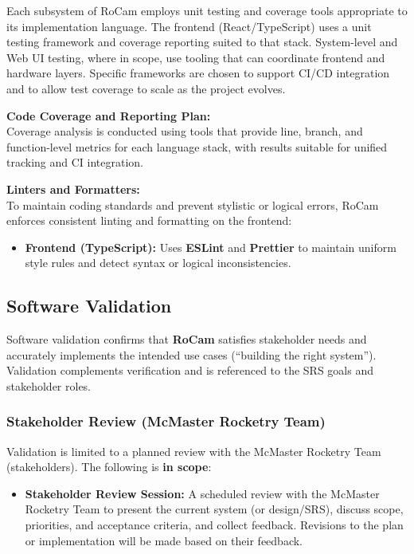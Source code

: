 \documentclass[12pt, titlepage]{article}
\begin{document}
Each subsystem of RoCam employs unit testing and coverage tools appropriate to
its implementation language. The frontend (React/TypeScript) uses a unit
testing framework and coverage reporting suited to that stack. System-level and
Web UI testing, where in scope, use tooling that can coordinate frontend and
hardware layers. Specific frameworks are chosen to support CI/CD integration
and to allow test coverage to scale as the project evolves.

\textbf{Code Coverage and Reporting Plan:} \\
Coverage analysis is conducted using tools that provide line, branch, and
function-level metrics for each language stack, with results suitable for
unified tracking and CI integration.

\textbf{Linters and Formatters:} \\
To maintain coding standards and prevent stylistic or logical errors, RoCam enforces
consistent linting and formatting on the frontend:
\begin{itemize}
  \item \textbf{Frontend (TypeScript):} Uses \textbf{ESLint} and \textbf{Prettier} to
        maintain uniform style rules and detect syntax or logical inconsistencies.
\end{itemize}

\subsection{Software Validation}

Software validation confirms that \textbf{RoCam} satisfies stakeholder needs
and accurately implements the intended use cases (``building the right
system''). Validation complements verification and is referenced to the SRS
goals and stakeholder roles.

\subsubsection*{Stakeholder Review (McMaster Rocketry Team)}
Validation is limited to a planned review with the McMaster Rocketry Team
(stakeholders). The following is \textbf{in scope}:
\begin{itemize}
  \item \textbf{Stakeholder Review Session:} A scheduled review with the
        McMaster Rocketry Team to present the current system (or design/SRS),
        discuss scope, priorities, and acceptance criteria, and collect
        feedback. Revisions to the plan or implementation will be made based
        on their feedback.
\end{itemize}
\end{document}
